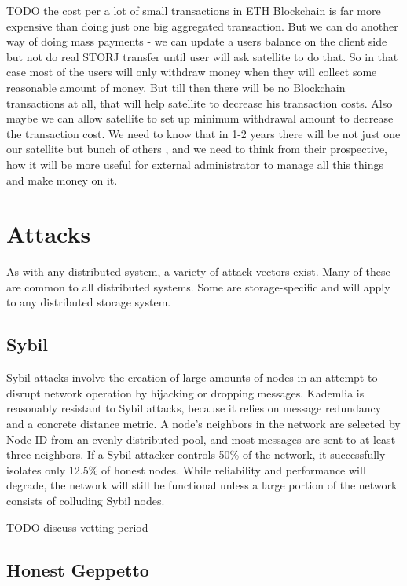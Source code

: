 \documentclass[11pt,fleqn,openany]{book}
\newcommand{\todo}[1]{{\color{red} TODO #1 }}
\begin{document}
\todo{the cost per a lot of small transactions in ETH Blockchain is far more expensive than doing just one big aggregated transaction.
But we can do another way of doing mass payments - we can update a users balance on the client side but not do real STORJ transfer until user will ask satellite to do that. So in that case most of the users will only withdraw money when they will collect some reasonable amount of money. But till then there will be no Blockchain transactions at all, that will help satellite to decrease his transaction costs. Also maybe we can allow satellite to set up minimum withdrawal amount to decrease the transaction cost.
We need to know that in 1-2 years there will be not just one our satellite but bunch of others , and we need to think from their prospective, how it will be more useful for external administrator to manage all this things and make money on it.
}
\newpage \appendix

\chapter{Attacks}

As with any distributed system, a variety of attack vectors exist. Many of these
are common to all distributed systems. Some are storage-specific and will apply
to any distributed storage system.

\section{Sybil}

Sybil attacks involve the creation of large amounts of nodes in an attempt to
disrupt network operation by hijacking or dropping messages. Kademlia
is reasonably
resistant to Sybil attacks, because
it relies on message redundancy and a concrete distance metric.
A node's neighbors in the network are selected by
Node ID from an evenly distributed pool, and most messages are sent to at least
three neighbors. If a Sybil attacker controls 50\% of the network, it
successfully isolates only 12.5\% of honest nodes. While reliability and
performance will degrade, the network will still be functional unless a large
portion of the network consists of colluding Sybil nodes.

\todo{discuss vetting period}

\section{Honest Geppetto}
\end{document}
